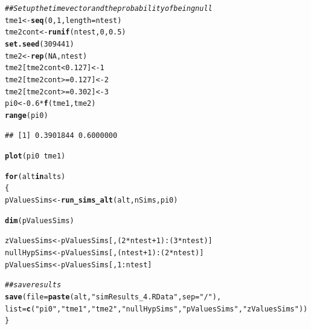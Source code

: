 \documentclass{article}\usepackage[]{graphicx}\usepackage[]{color}
\makeatletter
\newcommand{\hlnum}[1]{\textcolor[rgb]{0.686,0.059,0.569}{#1}}%
\newcommand{\hlstr}[1]{\textcolor[rgb]{0.192,0.494,0.8}{#1}}%
\newcommand{\hlcom}[1]{\textcolor[rgb]{0.678,0.584,0.686}{\textit{#1}}}%
\newcommand{\hlopt}[1]{\textcolor[rgb]{0,0,0}{#1}}%
\newcommand{\hlstd}[1]{\textcolor[rgb]{0.345,0.345,0.345}{#1}}%
\newcommand{\hlkwa}[1]{\textcolor[rgb]{0.161,0.373,0.58}{\textbf{#1}}}%
\newcommand{\hlkwb}[1]{\textcolor[rgb]{0.69,0.353,0.396}{#1}}%
\newcommand{\hlkwc}[1]{\textcolor[rgb]{0.333,0.667,0.333}{#1}}%
\newcommand{\hlkwd}[1]{\textcolor[rgb]{0.737,0.353,0.396}{\textbf{#1}}}%
\newenvironment{kframe}{%
 \def\at@end@of@kframe{}%
 \ifinner\ifhmode%
  \def\at@end@of@kframe{\end{minipage}}%
  \begin{minipage}{\columnwidth}%
 \fi\fi%
 \def\FrameCommand##1{\hskip\@totalleftmargin \hskip-\fboxsep
 \colorbox{shadecolor}{##1}\hskip-\fboxsep
     \hskip-\linewidth \hskip-\@totalleftmargin \hskip\columnwidth}%
 \MakeFramed {\advance\hsize-\width
   \@totalleftmargin\z@ \linewidth\hsize
   \@setminipage}}%
 {\par\unskip\endMakeFramed%
 \at@end@of@kframe}
\newenvironment{knitrout}{}{} %
\makeatother
\begin{document}
\begin{knitrout}
\color{fgcolor}\begin{kframe}
\begin{alltt}
\hlcom{## Set up the time vector and the probability of being null}
\hlstd{tme1} \hlkwb{<-} \hlkwd{seq}\hlstd{(}\hlnum{0}\hlstd{,}\hlnum{1}\hlstd{,}\hlkwc{length}\hlstd{=ntest)}
\hlstd{tme2cont} \hlkwb{<-} \hlkwd{runif}\hlstd{(ntest,}\hlnum{0}\hlstd{,}\hlnum{0.5}\hlstd{)}
\hlkwd{set.seed}\hlstd{(}\hlnum{309441}\hlstd{)}
\hlstd{tme2} \hlkwb{<-} \hlkwd{rep}\hlstd{(}\hlnum{NA}\hlstd{, ntest)}
\hlstd{tme2[tme2cont} \hlopt{<} \hlnum{0.127}\hlstd{]} \hlkwb{<-} \hlnum{1}
\hlstd{tme2[tme2cont} \hlopt{>=} \hlnum{0.127}\hlstd{]} \hlkwb{<-} \hlnum{2}
\hlstd{tme2[tme2cont} \hlopt{>=} \hlnum{0.302}\hlstd{]} \hlkwb{<-} \hlnum{3}
\hlstd{pi0} \hlkwb{<-} \hlnum{0.6}\hlopt{*}\hlkwd{f}\hlstd{(tme1, tme2)}
\hlkwd{range}\hlstd{(pi0)}
\end{alltt}
\begin{verbatim}
## [1] 0.3901844 0.6000000
\end{verbatim}
\begin{alltt}
\hlkwd{plot}\hlstd{(pi0} \hlopt{~} \hlstd{tme1)}

\hlkwa{for}\hlstd{(alt} \hlkwa{in} \hlstd{alts)}
\hlstd{\{}
  \hlstd{pValuesSims} \hlkwb{<-} \hlkwd{run_sims_alt}\hlstd{(alt, nSims, pi0)}

  \hlkwd{dim}\hlstd{(pValuesSims)}

  \hlstd{zValuesSims} \hlkwb{<-} \hlstd{pValuesSims[,(}\hlnum{2}\hlopt{*}\hlstd{ntest}\hlopt{+}\hlnum{1}\hlstd{)}\hlopt{:}\hlstd{(}\hlnum{3}\hlopt{*}\hlstd{ntest)]}
  \hlstd{nullHypSims} \hlkwb{<-} \hlstd{pValuesSims[,(ntest}\hlopt{+}\hlnum{1}\hlstd{)}\hlopt{:}\hlstd{(}\hlnum{2}\hlopt{*}\hlstd{ntest)]}
  \hlstd{pValuesSims} \hlkwb{<-} \hlstd{pValuesSims[,}\hlnum{1}\hlopt{:}\hlstd{ntest]}

  \hlcom{##save results}
  \hlkwd{save}\hlstd{(}\hlkwc{file}\hlstd{=}\hlkwd{paste}\hlstd{(alt,} \hlstr{"simResults_4.RData"}\hlstd{,}\hlkwc{sep}\hlstd{=}\hlstr{"/"}\hlstd{),}
       \hlkwc{list}\hlstd{=}\hlkwd{c}\hlstd{(}\hlstr{"pi0"}\hlstd{,} \hlstr{"tme1"}\hlstd{,} \hlstr{"tme2"}\hlstd{,} \hlstr{"nullHypSims"}\hlstd{,}\hlstr{"pValuesSims"}\hlstd{,}\hlstr{"zValuesSims"}\hlstd{))}
\hlstd{\}}
\end{alltt}
\end{kframe}


\end{knitrout}
\end{document}
